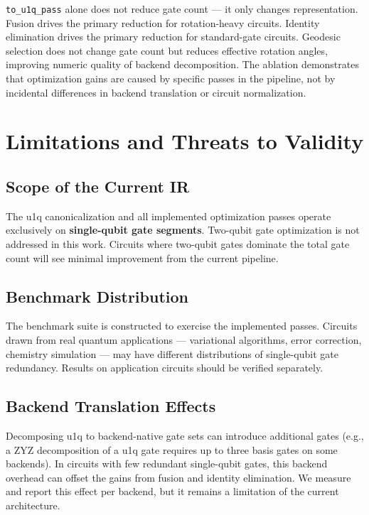 \documentclass[conference]{IEEEtran}
\begin{document}
\texttt{to\_u1q\_pass} alone does not reduce gate count --- it only changes representation.
Fusion drives the primary reduction for rotation-heavy circuits. Identity elimination drives
the primary reduction for standard-gate circuits. Geodesic selection does not change gate
count but reduces effective rotation angles, improving numeric quality of backend
decomposition. The ablation demonstrates that optimization gains are caused by specific passes
in the pipeline, not by incidental differences in backend translation or circuit normalization.

\section{Limitations and Threats to Validity}

\subsection{Scope of the Current IR}

The u1q canonicalization and all implemented optimization passes operate exclusively on
\textbf{single-qubit gate segments}. Two-qubit gate optimization is not addressed in this
work. Circuits where two-qubit gates dominate the total gate count will see minimal
improvement from the current pipeline.

\subsection{Benchmark Distribution}

The benchmark suite is constructed to exercise the implemented passes. Circuits drawn from
real quantum applications --- variational algorithms, error correction, chemistry simulation
--- may have different distributions of single-qubit gate redundancy. Results on application
circuits should be verified separately.

\subsection{Backend Translation Effects}

Decomposing u1q to backend-native gate sets can introduce additional gates (e.g., a ZYZ
decomposition of a u1q gate requires up to three basis gates on some backends). In circuits
with few redundant single-qubit gates, this backend overhead can offset the gains from fusion
and identity elimination. We measure and report this effect per backend, but it remains a
limitation of the current architecture.
\end{document}
